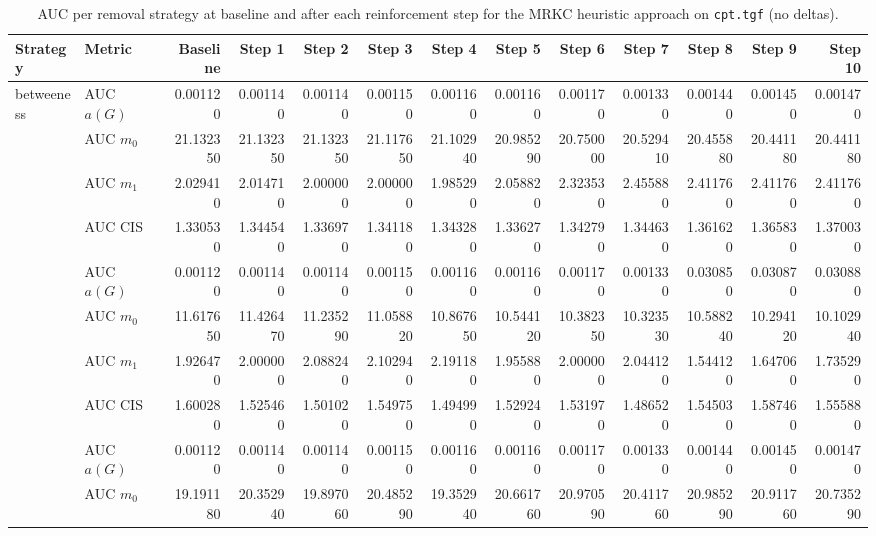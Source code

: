 \begin{table}[htbp]
  \centering
  \caption{AUC per removal strategy at baseline and after each reinforcement step for the MRKC heuristic approach on \texttt{cpt.tgf} (no deltas).}
  \label{tab:cpt-mrkc_heuristic-auc}
\setlength{\tabcolsep}{2.5pt}
  \begin{tabular}{llrrrrrrrrrrr}
    \toprule
    \textbf{Strategy} & \textbf{Metric} & \textbf{Baseline} & \textbf{Step 1} & \textbf{Step 2} & \textbf{Step 3} & \textbf{Step 4} & \textbf{Step 5} & \textbf{Step 6} & \textbf{Step 7} & \textbf{Step 8} & \textbf{Step 9} & \textbf{Step 10} \\
    \midrule
    \multirow{4}{*}{betweeness} & AUC $a(G)$ & 0.001120 & 0.001140 & 0.001140 & 0.001150 & 0.001160 & 0.001160 & 0.001170 & 0.001330 & 0.001440 & 0.001450 & 0.001470 \\
    & AUC $m_0$ & 21.132350 & 21.132350 & 21.132350 & 21.117650 & 21.102940 & 20.985290 & 20.750000 & 20.529410 & 20.455880 & 20.441180 & 20.441180 \\
    & AUC $m_1$ & 2.029410 & 2.014710 & 2.000000 & 2.000000 & 1.985290 & 2.058820 & 2.323530 & 2.455880 & 2.411760 & 2.411760 & 2.411760 \\
    & AUC CIS & 1.330530 & 1.344540 & 1.336970 & 1.341180 & 1.343280 & 1.336270 & 1.342790 & 1.344630 & 1.361620 & 1.365830 & 1.370030 \\
    \addlinespace
    \multirow{4}{*}{closeness} & AUC $a(G)$ & 0.001120 & 0.001140 & 0.001140 & 0.001150 & 0.001160 & 0.001160 & 0.001170 & 0.001330 & 0.030850 & 0.030870 & 0.030880 \\
    & AUC $m_0$ & 11.617650 & 11.426470 & 11.235290 & 11.058820 & 10.867650 & 10.544120 & 10.382350 & 10.323530 & 10.588240 & 10.294120 & 10.102940 \\
    & AUC $m_1$ & 1.926470 & 2.000000 & 2.088240 & 2.102940 & 2.191180 & 1.955880 & 2.000000 & 2.044120 & 1.544120 & 1.647060 & 1.735290 \\
    & AUC CIS & 1.600280 & 1.525460 & 1.501020 & 1.549750 & 1.494990 & 1.529240 & 1.531970 & 1.486520 & 1.545030 & 1.587460 & 1.555880 \\
    \addlinespace
    \multirow{4}{*}{core influence} & AUC $a(G)$ & 0.001120 & 0.001140 & 0.001140 & 0.001150 & 0.001160 & 0.001160 & 0.001170 & 0.001330 & 0.001440 & 0.001450 & 0.001470 \\
    & AUC $m_0$ & 19.191180 & 20.352940 & 19.897060 & 20.485290 & 19.352940 & 20.661760 & 20.970590 & 20.411760 & 20.985290 & 20.911760 & 20.735290 \\

\end{tabular}
\end{table}
